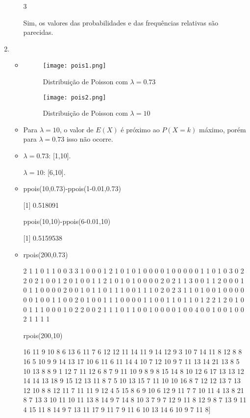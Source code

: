 \documentclass[11pt,a4paper]{book}
\begin{document}
\begin{enumerate}
\begin{itemize}
				3
				
				Sim, os valores das probabilidades e das frequências relativas são parecidas.
			\end{itemize}
		\item
			\begin{itemize}
				\item
					\begin{figure}[t]
						\centering
						\texttt{[image: pois1.png]}
						\caption{Distribuição de Poisson com $\lambda = 0.73$}
					\end{figure}
					\begin{figure}[t]
						\centering
						\texttt{[image: pois2.png]}
						\caption{Distribuição de Poisson com $\lambda = 10$}
					\end{figure}
				\item
					Para $\lambda = 10$, o valor de $E(X)$ é próximo ao $P(X=k)$ máximo, porém para $\lambda = 0.73$ isso não ocorre.
				\item
					$\lambda = 0.73$: [1,10].
					
					$\lambda = 10$: [6,10].
				\item
					ppois(10,0.73)-ppois(1-0.01,0.73)

					[1] 0.518091
					
					ppois(10,10)-ppois(6-0.01,10)

					[1] 0.5159538
					
				\item
					rpois(200,0.73)
  
  					2 1 1 0 1 1 0 0 3 3 1 0 0 0 1 2 1 0 1 0 1 0 0 0 0 1 0 0 0 0 0 1 1 0 1 0 3 0 2 2 0 2 1 0 0 1 2 0 1 0 0 1 1 2 1 0 1 0 1 0 0 0 0 2 0 2 1 1 3 0 0 1 1 2 0 0 0 1 0 1 1 0 0 0 0 2 0 0 1 0 1 1 0 1 1 1 0 0 1 1 1 0 2 0 2 3 1 1 0 1 0 0 1 0 0 0 0 0 0 1 0 0 1 1 0 0 2 0 1 0 0 1 1 1 0 0 0 0 1 1 0 0 1 1 0 1 1 0 1 2 2 1 2 0 1 0 0 1 1 1 0 0 0 1 0 2 2 0 0 2 1 1 1 0 1 1 0 0 1 0 0 0 0 1 0 0 4 0 0 1 0 0 1 0 0 2 1 1 1 1
  					
  					rpois(200,10)
  
  					16 11  9 10  8  6 13  6 11  7  6 12 12 11 14 11  9 14 12 9 3 10 7 14 11 8 12 8 8 16 5 10 9 9 14 13 17 10 6 11 6 11 14 4 10 7 12 10 9 7 11 13 14 21 13  8  5 10 13  8  8  9  1 12  7 11 12  6  8  7  9 11 10  9  8  9  8 15 14  8 10 12  6 17 13 13 12 14 14 13 18  9 15 12 13 11 8  7  5 10 13 15  7 11 10 10 16  8  7 12 12 13  7 13 12 10  8  8 12 11 7 11 11  9 12  4  5 15  8  6  9 10  6 12  9 11  7  7 10 11  4 13  8 21 8  7 13  3 10 11 10 11 13  8 14  9  7 14  8 10  3  7  9  7 12  9 11  8 12  9  8  7 13  9 11  4 15 11  8 14  9  7 13 11 17  9 11  7  9 11  6 10 13 14  6 10  9  7 11  8]
  					

\end{itemize}
\end{enumerate}
\end{document}
